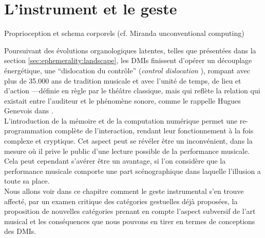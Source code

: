 %
\chapter{L'instrument et le geste}
\label{ch:gesture}


Proprioception et schema corporels (cf. Miranda unconventional computing)


\noindent Poursuivant des évolutions organologiques latentes, telles que présentées dans la section \ref{sec:ephemerality:landscape}, les \glspl{DMI} finissent d'opérer un découplage énergétique, une ``dislocation du contrôle'' (\textit{control dislocation} \cite{miranda_new_2006}), rompant avec plus de 35.000 ans de tradition musicale \cite{conard_new_2009} et avec l'unité de temps, de lieu et d'action —définie en règle par le théâtre classique, mais qui reflète la relation qui existait entre l'auditeur et le phénomène sonore, comme le rappelle Hugues Genevois dans \cite{cance_what_2012}.\\
\indent L'introduction de la mémoire et de la computation numérique permet une re-programmation complète de l'interaction, rendant leur fonctionnement à la fois complexe et cryptique. Cet aspect peut se révéler être un inconvénient, dans la mesure où il prive le public d’une lecture possible de la performance musicale. Cela peut cependant s’avérer être un avantage, si l'on considère que la performance musicale comporte une part scénographique dans laquelle l’illusion a toute sa place.\\
\indent Nous allons voir dans ce chapitre comment le geste instrumental s'en trouve affecté, par un examen critique des catégories gestuelles déjà proposées, la proposition de nouvelles catégories prenant en compte l'aspect subversif de l'art musical et les conséquences que nous pouvons en tirer en termes de conceptions des \glspl{DMI}.


